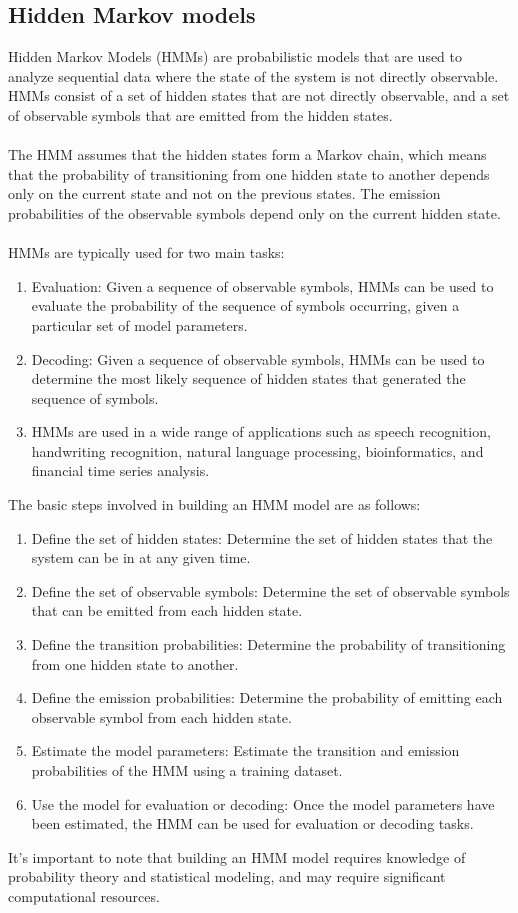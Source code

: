         \subsection{Hidden Markov models}
        Hidden Markov Models (HMMs) are probabilistic models that are used to analyze sequential data where the state of the system is not directly observable.
        HMMs consist of a set of hidden states that are not directly observable, and a set of observable symbols that are emitted from the hidden states.\\
        \\
        The HMM assumes that the hidden states form a Markov chain, which means that the probability of transitioning from one hidden state to another
        depends only on the current state and not on the previous states. The emission probabilities of the observable symbols depend
        only on the current hidden state.\\
        \\
        HMMs are typically used for two main tasks:
        \begin{enumerate}
            \item Evaluation: Given a sequence of observable symbols, HMMs can be used to evaluate the probability of the sequence of symbols occurring, given a particular set of model parameters.
            \item Decoding: Given a sequence of observable symbols, HMMs can be used to determine the most likely sequence of hidden states that generated the sequence of symbols.
            \item HMMs are used in a wide range of applications such as speech recognition, handwriting recognition, natural language processing, bioinformatics, and financial time series analysis.
        \end{enumerate}
        The basic steps involved in building an HMM model are as follows:
        \begin{enumerate}
            \item Define the set of hidden states: Determine the set of hidden states that the system can be in at any given time.
            \item Define the set of observable symbols: Determine the set of observable symbols that can be emitted from each hidden state.
            \item Define the transition probabilities: Determine the probability of transitioning from one hidden state to another.
            \item Define the emission probabilities: Determine the probability of emitting each observable symbol from each hidden state.
            \item Estimate the model parameters: Estimate the transition and emission probabilities of the HMM using a training dataset.
            \item Use the model for evaluation or decoding: Once the model parameters have been estimated, the HMM
            can be used for evaluation or decoding tasks.
        \end{enumerate}
        It's important to note that building an HMM model requires knowledge of probability theory and statistical
        modeling, and may require significant computational resources.
